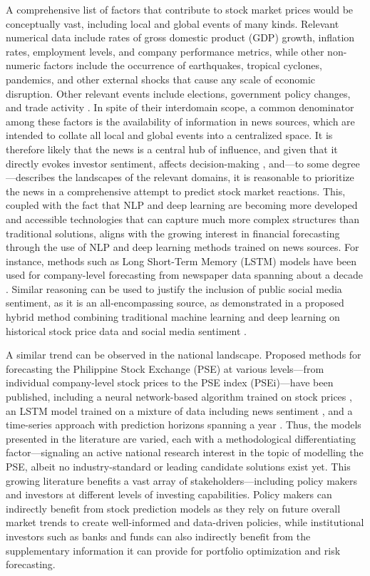 \documentclass[stu,floatsintext]{apa7}
\begin{document}
A comprehensive list of factors that contribute to stock market prices would be conceptually vast, including local and global events of many kinds. Relevant numerical data include rates of gross domestic product (GDP) growth, inflation rates, employment levels, and company performance metrics, while other non-numeric factors include the occurrence of earthquakes, tropical cyclones, pandemics, and other external shocks that cause any scale of economic disruption. Other relevant events include elections, government policy changes, and trade activity \parencite{thompson2024factors}. In spite of their interdomain scope, a common denominator among these factors is the availability of information in news sources, which are intended to collate all local and global events into a centralized space. It is therefore likely that the news is a central hub of influence, and given that it directly evokes investor sentiment, affects decision-making \parencite{puh2023predicting}, and—to some degree—describes the landscapes of the relevant domains, it is reasonable to prioritize the news in a comprehensive attempt to predict stock market reactions. This, coupled with the fact that NLP and deep learning are becoming more developed and accessible technologies \parencite{feng2025evolution} that can capture much more complex structures than traditional solutions, aligns with the growing interest in financial forecasting through the use of NLP and deep learning methods trained on news sources. For instance, methods such as Long Short-Term Memory (LSTM) models have been used for company-level forecasting from newspaper data spanning about a decade \parencite{akita2016deep}. Similar reasoning can be used to justify the inclusion of public social media sentiment, as it is an all-encompassing source, as demonstrated in a proposed hybrid method combining traditional machine learning and deep learning on historical stock price data and social media sentiment \parencite{mehtab2019robust}.

A similar trend can be observed in the national landscape. Proposed methods for forecasting the Philippine Stock Exchange (PSE) at various levels—from individual company-level stock prices to the PSE index (PSEi)—have been published, including a neural network-based algorithm trained on stock prices \parencite{barrios2024forecasting}, an LSTM model trained on a mixture of data including news sentiment \parencite{sombrito2023philippine}, and a time-series approach with prediction horizons spanning a year \parencite{lacanilao2021application}. Thus, the models presented in the literature are varied, each with a methodological differentiating factor—signaling an active national research interest in the topic of modelling the PSE, albeit no industry-standard or leading candidate solutions exist yet. This growing literature benefits a vast array of stakeholders—including policy makers and investors at different levels of investing capabilities. Policy makers can indirectly benefit from stock prediction models as they rely on future overall market trends to create well-informed and data-driven policies, while institutional investors such as banks and funds can also indirectly benefit from the supplementary information it can provide for portfolio optimization and risk forecasting.
\end{document}
